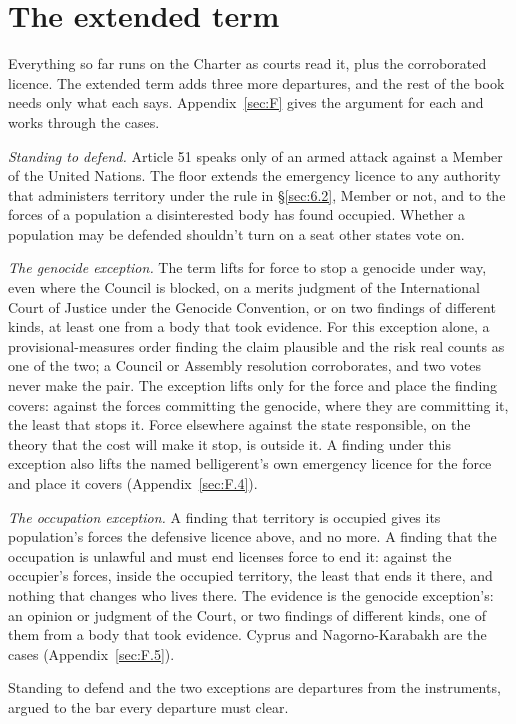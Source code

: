 \section{The extended term}
\label{sec:6.7}
Everything so far runs on the Charter as courts read it, plus the corroborated licence. The extended term adds three more departures, and the rest of the book needs only what each says. Appendix~\ref{sec:F} gives the argument for each and works through the cases.

\emph{Standing to defend.} Article 51 speaks only of an armed attack against a Member of the United Nations. The floor extends the emergency licence to any authority that administers territory under the rule in \S\ref{sec:6.2}, Member or not, and to the forces of a population a disinterested body has found occupied. Whether a population may be defended shouldn't turn on a seat other states vote on.

\emph{The genocide exception.} The term lifts for force to stop a genocide under way, even where the Council is blocked, on a merits judgment of the International Court of Justice under the Genocide Convention, or on two findings of different kinds, at least one from a body that took evidence. For this exception alone, a provisional-measures order finding the claim plausible and the risk real counts as one of the two; a Council or Assembly resolution corroborates, and two votes never make the pair. The exception lifts only for the force and place the finding covers: against the forces committing the genocide, where they are committing it, the least that stops it. Force elsewhere against the state responsible, on the theory that the cost will make it stop, is outside it. A finding under this exception also lifts the named belligerent's own emergency licence for the force and place it covers (Appendix~\ref{sec:F.4}).

\emph{The occupation exception.} A finding that territory is occupied gives its population's forces the defensive licence above, and no more. A finding that the occupation is unlawful and must end licenses force to end it: against the occupier's forces, inside the occupied territory, the least that ends it there, and nothing that changes who lives there. The evidence is the genocide exception's: an opinion or judgment of the Court, or two findings of different kinds, one of them from a body that took evidence. Cyprus and Nagorno-Karabakh are the cases (Appendix~\ref{sec:F.5}).

Standing to defend and the two exceptions are departures from the instruments, argued to the bar every departure must clear.
